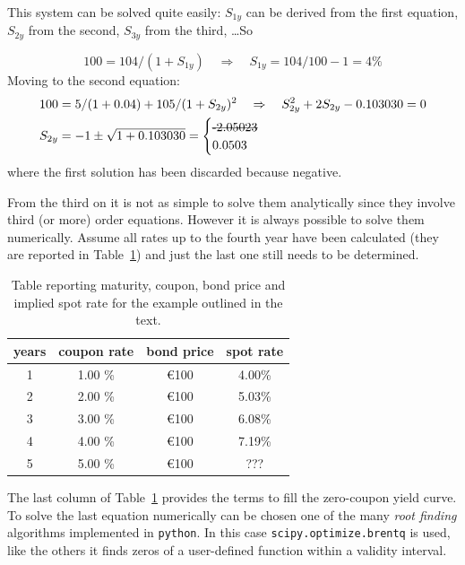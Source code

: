 This system can be solved quite easily: $S_{1y}$ can be derived from the first equation, $S_{2y}$ from the second, $S_{3y}$ from the third, \ldots So

\begin{equation}
100 = 104 / (1 + S_{1y})\quad\Rightarrow\quad S_{1y} = 104/100 - 1 = 4\%
\end{equation}
Moving to the second equation:
\begin{equation}
\begin{split}
& 100 = 5 / (1 + 0.04) + 105 / (1 + S_{2y})^{2}\quad\Rightarrow\quad S_{2y}^2  + 2 S_{2y}  - 0.103030 = 0 \\
& S_{2y} = - 1 \pm \sqrt{1 + 0.103030} = \begin{cases}\text{\sout{-2.05023}} \\ 0.0503\end{cases}
\end{split}
\end{equation}
where the first solution has been discarded because negative.

From the third on it is not as simple to solve them analytically since they involve third (or more) order equations. However it is always possible to solve them numerically.
Assume all rates up to the fourth year have been calculated (they are reported in Table~\ref{tab:rates}) and just the last one still needs to be determined.

\begin{table}[htb]
\begin{center}
\begin{tabular}{|c|c|c|c|}
\hline
\textbf{years} & \textbf{coupon rate} & \textbf{bond price} & \textbf{spot rate} \\
\hline
1 & 1.00 \% & \euro{100} & 4.00\% \\
\hline
2 & 2.00 \% & \euro{100} & 5.03\% \\
\hline
3 & 3.00 \% & \euro{100} & 6.08\% \\
\hline
4 & 4.00 \% & \euro{100} & 7.19\% \\
\hline
5 & 5.00 \% & \euro{100} & ??? \\
\hline
\end{tabular}
\end{center}
\caption{Table reporting maturity, coupon, bond price and implied spot rate for the example outlined in the text.}
\label{tab:rates}
\end{table}

The last column of Table~\ref{tab:rates} provides the terms to fill the zero-coupon yield curve.
To solve the last equation numerically can be chosen one of the many \emph{root finding} algorithms implemented in \texttt{python}. 
In this case \texttt{scipy.optimize.brentq} is used, like the others it finds zeros of a user-defined function within a validity interval.


